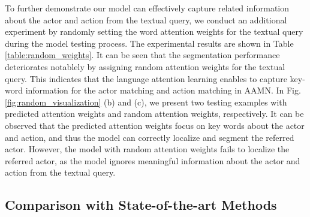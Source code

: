 \documentclass[journal]{IEEEtran}
\begin{document}
\begin{table}[!tb]
\begin{threeparttable}
\caption{Comparison with random attention weights.}
\label{table:random_weights}
\centering
{}
\end{threeparttable}
\vspace{-0.1cm}
\end{table}

To further demonstrate our model can effectively capture related information about the actor and action from the textual query, we conduct an additional experiment by randomly setting the word attention weights for the textual query during the model testing process. The experimental results are shown in Table \ref{table:random_weights}. It can be seen that the segmentation performance deteriorates notablely by assigning random attention weights for the textual query. This indicates that the language attention learning enables to capture key-word information for the actor matching and action matching in AAMN. In Fig. \ref{fig:random_visualization} (b) and (c), we present two testing examples with predicted attention weights and random attention weights, respectively. It can be observed that the predicted attention weights focus on key words about the actor and action, and thus the model can correctly localize and segment the referred actor. However, the model with random attention weights fails to localize the referred actor, as the model ignores meaningful information about the actor and action from the textual query.

\subsection{Comparison with State-of-the-art Methods}
\end{document}
